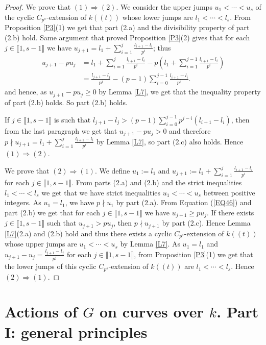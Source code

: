 \documentclass[11pt]{amsart}
\begin{document}
\begin{proof}
We prove that $(1)\Rightarrow (2)$. We consider the upper jumps $u_1<\cdots<u_s$ of the cyclic $C_{p^s}$-extension of $k((t))$ whose lower jumps are $l_1<\cdots<l_s$. From Proposition \ref{P3}(1) we get that part (2.a) and the divisibility property of part (2.b) hold. Same argument that proved Proposition \ref{P3}(2) gives that for each $j\in\llbracket1,s-1\rrbracket$ we have $u_{j+1}=l_1+\sum_{i=1}^j \frac{l_{i+1}-l_i}{p^i}$; thus 
\begin{equation}\label{EQ46}
\begin{split}
u_{j+1}-pu_j
&=l_1+\sum_{i=1}^j \frac{l_{i+1}-l_i}{p^i}
-p\left(l_1+\sum_{i=1}^{j-1} \frac{l_{i+1}-l_i}{p^i}\right)\\
&=\frac{l_{j+1}-l_j}{p^j}-(p-1)\sum_{i=0}^{j-1} \frac{l_{i+1}-l_i}{p^i}.
\end{split}
\end{equation}
and hence, as $u_{j+1}-pu_j\ge 0$ by Lemma \ref{L7}, we get that the inequality property of part (2.b) holds. So part (2.b) holds.

If $j\in\llbracket1,s-1\rrbracket$ is such that $l_{j+1}-l_j> (p-1)\sum_{i=0}^{j-1} p^{j-i}(l_{i+1}-l_i)$, then from the last paragraph we get that $u_{j+1}-pu_j>0$ and therefore $p\nmid u_{j+1}=l_1+\sum_{i=1}^{j}\frac{l_{i+1}-l_i}{p^i}$ by Lemma \ref{L7}, so part (2.c) also holds. Hence $(1)\Rightarrow (2)$.

We prove that $(2)\Rightarrow (1)$. We define $u_1:=l_1$ and $u_{j+1}:= l_1+\sum_{i=1}^{j}\frac{l_{i+1}-l_i}{p^i}$ for each $j\in\llbracket1,s-1\rrbracket$. From parts (2.a) and (2.b) and the strict inequalities $l_1<\cdots<l_s$ we get that we have strict inequalities $u_1<\cdots<u_s$ between positive integers. As $u_1=l_1$, we have $p\nmid u_1$ by part (2.a). From Equation (\ref{EQ46}) and part (2.b) we get that for each $j\in\llbracket1,s-1\rrbracket$ we have $u_{j+1}\ge pu_j$. If there exists  $j\in\llbracket1,s-1\rrbracket$ such that $u_{j+1}> pu_j$, then $p\nmid u_{j+1}$ by part (2.c). Hence Lemma \ref{L7}(2.a) and (2.b) hold and thus there exists a cyclic $C_{p^s}$-extension of $k((t))$ whose upper jumps are $u_1<\cdots<u_s$ by Lemma \ref{L7}. As $u_1=l_1$ and $u_{j+1}-u_j=\frac{l_{j+1}-l_j}{p^j}$ for each $j\in\llbracket1,s-1\rrbracket$, from Proposition \ref{P3}(1) we get that the lower jumps of this cyclic $C_{p^s}$-extension of $k((t))$ are $l_1<\cdots<l_s$. Hence $(2)\Rightarrow (1)$.
\end{proof}

\section{Actions of $G$ on curves over $k$. Part I: general principles}\label{S10}
\end{document}
